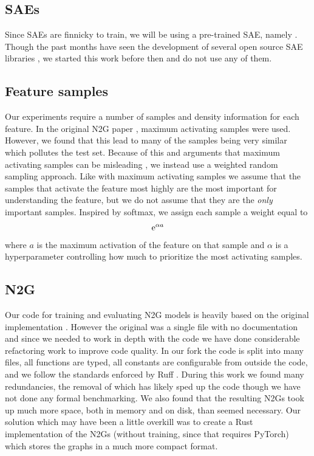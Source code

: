 \documentclass[../main.tex]{subfiles}
\begin{document}

\subsection{SAEs}
Since SAEs are finnicky to train, we will be using a pre-trained SAE, namely .
Though the past months have seen the development of several open source SAE libraries , we started this work before then and do not use any of them.

\subsection{Feature samples}
Our experiments require a number of samples and density information for each feature.
In the original N2G paper , maximum activating samples were used.
However, we found that this lead to many of the samples being very similar which pollutes the test set.
Because of this and arguments that maximum activating samples can be misleading , we instead use a weighted random sampling approach.
Like with maximum activating samples we assume that the samples that activate the feature most highly are the most important for understanding the feature, but we do not assume that they are the \emph{only} important samples.
Inspired by softmax, we assign each sample a weight equal to
\begin{align*}
    \mathrm{e}^{\alpha a}
\end{align*}
where $a$ is the maximum activation of the feature on that sample and $\alpha$ is a hyperparameter controlling how much to prioritize the most activating samples.

\subsection{N2G}
Our code for training and evaluating N2G models is heavily based on the original implementation .
However the original was a single file with no documentation and since we needed to work in depth with the code we have done considerable refactoring work to improve code quality.
In our fork  the code is split into many files, all functions are typed, all constants are configurable from outside the code, and we follow the standards enforced by Ruff .
During this work we found many redundancies, the removal of which has likely sped up the code though we have not done any formal benchmarking.
We also found that the resulting N2Gs took up much more space, both in memory and on disk, than seemed necessary.
Our solution which may have been a little overkill was to create a Rust implementation of the N2Gs (without training, since that requires PyTorch) which stores the graphs in a much more compact format.
\end{document}
